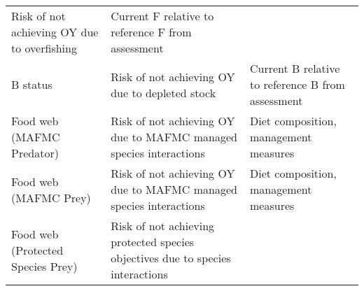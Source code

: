 \documentclass[11pt,]{article}
\begin{document}
\begin{longtable}[]{@{}lll@{}}
\begin{minipage}[t]{0.33\columnwidth}
Risk of not achieving OY due to overfishing\strut
\end{minipage} & \begin{minipage}[t]{0.33\columnwidth}\raggedright\strut
Current F relative to reference F from assessment\strut
\end{minipage}\tabularnewline
\begin{minipage}[t]{0.25\columnwidth}\raggedright\strut
B status\strut
\end{minipage} & \begin{minipage}[t]{0.33\columnwidth}\raggedright\strut
Risk of not achieving OY due to depleted stock\strut
\end{minipage} & \begin{minipage}[t]{0.33\columnwidth}\raggedright\strut
Current B relative to reference B from assessment\strut
\end{minipage}\tabularnewline
\begin{minipage}[t]{0.25\columnwidth}\raggedright\strut
Food web (MAFMC Predator)\strut
\end{minipage} & \begin{minipage}[t]{0.33\columnwidth}\raggedright\strut
Risk of not achieving OY due to MAFMC managed species interactions\strut
\end{minipage} & \begin{minipage}[t]{0.33\columnwidth}\raggedright\strut
Diet composition, management measures\strut
\end{minipage}\tabularnewline
\begin{minipage}[t]{0.25\columnwidth}\raggedright\strut
Food web (MAFMC Prey)\strut
\end{minipage} & \begin{minipage}[t]{0.33\columnwidth}\raggedright\strut
Risk of not achieving OY due to MAFMC managed species interactions\strut
\end{minipage} & \begin{minipage}[t]{0.33\columnwidth}\raggedright\strut
Diet composition, management measures\strut
\end{minipage}\tabularnewline
\begin{minipage}[t]{0.25\columnwidth}\raggedright\strut
Food web (Protected Species Prey)\strut
\end{minipage} & \begin{minipage}[t]{0.33\columnwidth}\raggedright\strut
Risk of not achieving protected species objectives due to species
interactions\strut
\end{minipage} & \begin{minipage}[t]{0.33\columnwidth}\raggedright\strut

\end{minipage}
\end{longtable}
\end{document}
